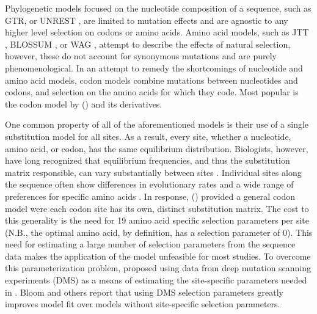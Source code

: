 \documentclass[fleqn,letterpaper]{article}
\begin{document}
Phylogenetic models focused on the nucleotide composition of a sequence, such as GTR, or UNREST \citep{Tavare1986,Yang1994}, are limited to mutation effects and are agnostic to any higher level selection on codons or amino acids.
Amino acid models, such as JTT \citep{jones1992}, BLOSSUM \citep{blossum}, or WAG \citep{whelan2001}, attempt to describe the effects of natural selection, however, these do not account for synonymous mutations and are purely phenomenological.
In an attempt to remedy the shortcomings of nucleotide and amino acid models, codon models combine mutations between nucleotides and codons, and selection on the amino acids for which they code.
Most popular is the codon model by \citet{GoldmanAndYang1994} (\gy) and its derivatives.

One common property of all of the aforementioned models is their use of a single substitution model for all sites. 
As a result, every site, whether a nucleotide,  amino acid, or codon, has the same equilibrium distribution.
Biologists, however, have long recognized that equilibrium frequencies, and thus the substitution matrix responsible, can vary substantially between sites \citep{felsenstein1981, gojobori1983}.
Individual sites along the sequence often show differences in evolutionary rates and a wide range of preferences for specific amino acids \citep{ashenberg2013, echave2016}.
In response, \citet{HalpernAndBruno1998} (\hb) provided a general codon model were each codon site has its own, distinct substitution matrix.
The cost to this generality is the need for 19 amino acid specific selection parameters per site (N.B., the optimal amino acid, by definition, has a selection parameter of 0).
This need for estimating a large number of selection parameters from the sequence data makes the application of the \hb model unfeasible for most studies.
To overcome this parameterization problem,\citet{bloom2014} proposed using data from deep mutation scanning experiments (DMS) as a means of estimating the site-specific parameters needed in \hb.
Bloom and others \citep{bloom2014, bloom2017, hilton2017} report that using DMS selection parameters greatly improves model fit over models without site-specific selection parameters.
\end{document}
